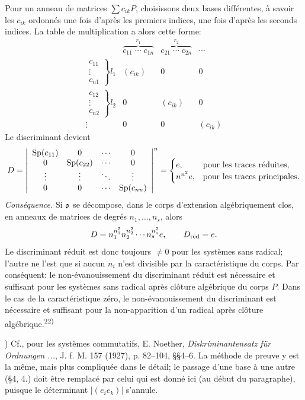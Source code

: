 Pour un anneau de matrices $\sum c_{ik}P$, choisissons deux bases différentes, à savoir les $c_{ik}$ ordonnés une fois d'après les premiers indices, une fois d'après les seconds indices. La table de multiplication a alors cette forme:
\[
\begin{array}{c|ccc}
& \overbrace{c_{11}\;\cdots\;c_{1n}}^{r_1}
& \overbrace{c_{21}\;\cdots\;c_{2n}}^{r_2}
& \cdots \\ \hline
\left.\begin{array}{c}c_{11}\\[-1mm]\vdots\\[-1mm]c_{n1}\end{array}\right\}l_1
& (c_{ik}) & 0 & 0 \\[1.3em]
\left.\begin{array}{c}c_{12}\\[-1mm]\vdots\\[-1mm]c_{n2}\end{array}\right\}l_2
& 0 & (c_{ik}) & 0 \\[1.3em]
\vdots & 0 & 0 & (c_{ik})
\end{array}
\]
Le discriminant devient
\[
        D=\left|\begin{array}{cccc}
        \operatorname{Sp}(c_{11})&0&\cdots&0\\
        0&\operatorname{Sp}(c_{22})&\cdots&0\\
        \vdots&\vdots&\ddots&\vdots\\
        0&0&\cdots&\operatorname{Sp}(c_{nn})
        \end{array}\right|^{n}
        =\begin{cases}
        e, & \hbox{pour les traces réduites},\\
        n^{n^2}e, & \hbox{pour les traces principales}.
        \end{cases}
\]
\emph{Conséquence.} Si $\mathfrak{o}$ se décompose, dans le corps d'extension algébriquement clos, en anneaux de matrices de degrés $n_1,\ldots,n_s$, alors
\[
        D=n_1^{n_1^2}n_2^{n_2^2}\cdots n_s^{n_s^2}e,
        \qquad
        D_{\rm red}=e.
\]
Le discriminant réduit est donc toujours $\ne0$ pour les systèmes sans radical; l'autre ne l'est que si aucun $n_i$ n'est divisible par la caractéristique du corps. Par conséquent: le non-évanouissement du discriminant réduit est nécessaire et suffisant pour les systèmes sans radical après clôture algébrique du corps $P$. Dans le cas de la caractéristique zéro, le non-évanouissement du discriminant est nécessaire et suffisant pour la non-apparition d'un radical après clôture algébrique.\textsuperscript{22)}

{\footnotesize{}) Cf., pour les systèmes commutatifs, E. Noether, \emph{Diskriminantensatz für Ordnungen ...}, J. f. M. 157 (1927), p. 82--104, \S{}\S{}4--6. La méthode de preuve y est la même, mais plus compliquée dans le détail; le passage d'une base à une autre (\S{}4, 4.) doit être remplacé par celui qui est donné ici (au début du paragraphe), puisque le déterminant $\left|(e_i e_k)\right|$ s'annule.\par}

